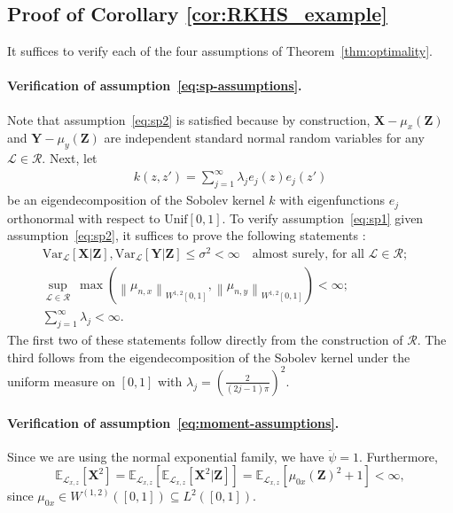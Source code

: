 \documentclass[12pt]{article}
\theoremstyle{definition}
\theoremstyle{remark}
\newcommand{\E}{\mathbb E}								%
\newcommand{\V}{\mathrm{Var}}							%
\newcommand{\norm}[1]{\left\lVert{#1}\right\rVert}		%
\newcommand{\prx}{\bm X}								%
\newcommand{\prz}{\bm Z}								%
\newcommand{\pry}{{\bm Y}}								%
\newcommand{\law}{\mathcal L}							%
\newcommand{\regclass}{\mathscr R}					    %
\begin{document}
\subsection{Proof of Corollary \ref{cor:RKHS_example}} \label{sec:proof-rkhs}

It suffices to verify each of the four assumptions of Theorem~\ref{thm:optimality}.

\paragraph{Verification of assumption~\eqref{eq:sp-assumptions}.}

Note that assumption~\eqref{eq:sp2} is satisfied because by construction, $\prx - \mu_{x}(\prz)$ and $\pry - \mu_y(\prz)$ are independent standard normal random variables for any $\law \in \regclass$. Next, let 
\begin{align}\label{eq:eigen_decomp}
	k(z,z')=\sum_{j=1}^{\infty}\lambda_{j}e_{j}(z)e_{j}(z')
\end{align}
be an eigendecomposition of the Sobolev kernel $k$ with eigenfunctions $e_{j}$ orthonormal with respect to $\text{Unif}[0,1]$. To verify assumption~\eqref{eq:sp1} given assumption~\eqref{eq:sp2}, it suffices to prove the following statements \citep[Theorem 11 and Remark 12]{Shah2018}: 
\begin{align*}
\V_{\law}[\prx|\prz], \V_{\law}[\pry|\prz] \leq \sigma^2 < \infty \quad \text{almost surely, for all } \law \in \regclass;& \\
\sup_{\law \in \regclass}\ \max(\norm{\mu_{n,x}}_{W^{1,2}[0,1]}, \norm{\mu_{n,y}}_{W^{1,2}[0,1]}) < \infty;& \\
\sum_{j = 1}^\infty \lambda_{j} < \infty.&
\end{align*}
The first two of these statements follow directly from the construction of $\regclass$. The third follows from the eigendecomposition of the Sobolev kernel under the uniform measure on $[0,1]$ \citep[Example 12.23]{Wainwright2019} with $\lambda_j = (\frac{2}{(2j-1)\pi})^2$.

\paragraph{Verification of assumption~\eqref{eq:moment-assumptions}.}

Since we are using the normal exponential family, we have $\ddot \psi = 1$. Furthermore, 
\begin{equation}
\E_{\law_{x,z}}[\prx^2] = \E_{\law_{x,z}}[\E_{\law_{x,z}}[\prx^2|\prz]] = \E_{\law_{x,z}}[\mu_{0x}(\prz)^2 + 1] < \infty,
\end{equation}
since $\mu_{0x} \in W^{(1,2)}([0,1]) \subseteq L^2([0,1])$.
\end{document}
